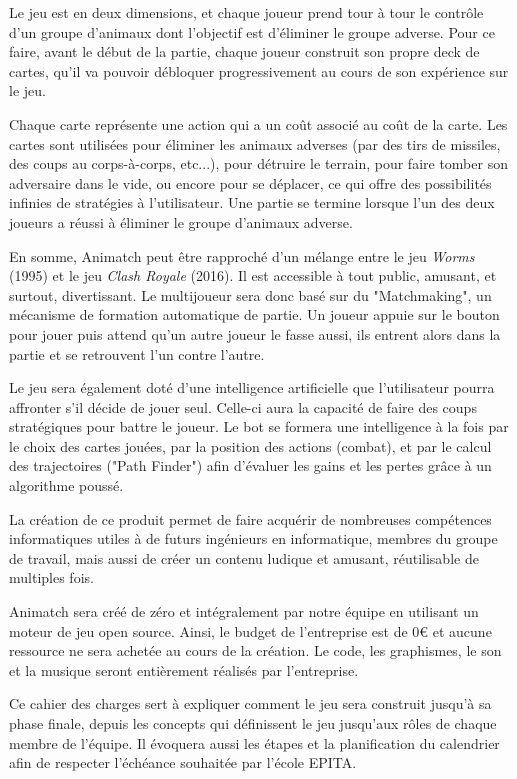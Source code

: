 \documentclass[12pt,a4paper]{article}
\begin{document}
Le jeu est en deux dimensions, et chaque joueur prend tour à tour le contrôle d'un groupe d'animaux dont l'objectif est d'éliminer le groupe adverse. Pour ce faire, avant le début de la partie, chaque joueur construit son propre deck de cartes, qu'il va pouvoir débloquer progressivement au cours de son expérience sur le jeu.

Chaque carte représente une action qui a un coût associé au coût de la carte. Les cartes sont utilisées pour éliminer les animaux adverses (par des tirs de missiles, des coups au corps-à-corps, etc...), pour détruire le terrain, pour faire tomber son adversaire dans le vide, ou encore pour se déplacer, ce qui offre des possibilités infinies de stratégies à l'utilisateur. Une partie se termine lorsque l'un des deux joueurs a réussi à éliminer le groupe d'animaux adverse.

En somme, Animatch peut être rapproché d'un mélange entre le jeu \textit{Worms} (1995) et le jeu \textit{Clash Royale} (2016). Il est accessible à tout public, amusant, et surtout, divertissant. Le multijoueur sera donc basé sur du "Matchmaking", un mécanisme de formation automatique de partie. Un joueur appuie sur le bouton pour jouer puis attend qu'un autre joueur le fasse aussi, ils entrent alors dans la partie et se retrouvent l'un contre l'autre.

Le jeu sera également doté d'une intelligence artificielle que l'utilisateur pourra affronter s'il décide de jouer seul. Celle-ci aura la capacité de faire des coups stratégiques pour battre le joueur. Le bot se formera une intelligence à la fois par le choix des cartes jouées, par la position des actions (combat), et par le calcul des trajectoires ("Path Finder") afin d'évaluer les gains et les pertes grâce à un algorithme poussé.

La création de ce produit permet de faire acquérir de nombreuses compétences informatiques utiles à de futurs ingénieurs en informatique, membres du groupe de travail, mais aussi de créer un contenu ludique et amusant, réutilisable de multiples fois.

Animatch sera créé de zéro et intégralement par notre équipe en utilisant un moteur de jeu open source. Ainsi, le budget de l'entreprise est de 0€ et aucune ressource ne sera achetée au cours de la création. Le code, les graphismes, le son et la musique seront entièrement réalisés par l'entreprise.

Ce cahier des charges sert à expliquer comment le jeu sera construit jusqu'à sa phase finale, depuis les concepts qui définissent le jeu jusqu'aux rôles de chaque membre de l'équipe. Il évoquera aussi les étapes et la planification du calendrier afin de respecter l'échéance souhaitée par l'école EPITA.
\clearpage
\end{document}
